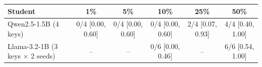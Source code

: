 \begin{tabular}{lccccc}
\toprule
Student & 1\% & 5\% & 10\% & 25\% & 50\%\\
\midrule
Qwen2.5-1.5B (4 keys) & 0/4 \scriptsize[0.00, 0.60] & 0/4 \scriptsize[0.00, 0.60] & 0/4 \scriptsize[0.00, 0.60] & 2/4 \scriptsize[0.07, 0.93] & 4/4 \scriptsize[0.40, 1.00]\\
Llama-3.2-1B (3 keys $\times$ 2 seeds) & -- & -- & 0/6 \scriptsize[0.00, 0.46] & -- & 6/6 \scriptsize[0.54, 1.00]\\
\bottomrule
\end{tabular}
